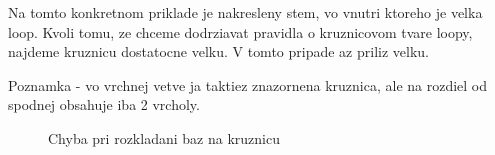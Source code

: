 Na tomto konkretnom priklade je nakresleny stem, vo vnutri ktoreho je velka loop. Kvoli tomu,
ze chceme dodrziavat pravidla o kruznicovom tvare loopy, najdeme kruznicu dostatocne velku.
V tomto pripade az priliz velku.

Poznamka - vo vrchnej vetve ja taktiez znazornena kruznica, ale na rozdiel od spodnej obsahuje iba 2 vrcholy.

\begin{figure}
  \caption{Chyba pri rozkladani baz na kruznicu}
  \label{obr:chyba_rozlozenie_loopy}
\end{figure}











